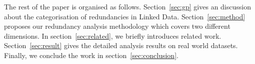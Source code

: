 The rest of the paper is organised as follows. Section~\ref{sec:gp} gives an discussion about the categorisation of redundancies in Linked Data. Section~\ref{sec:method} proposes our redundancy analysis methodology which covers two different dimensions. In section~\ref{sec:related}, we briefly introduces related work. Section~\ref{sec:result} gives the detailed analysis results on real world datasets. Finally, we conclude the work in section~\ref{sec:conclusion}.



